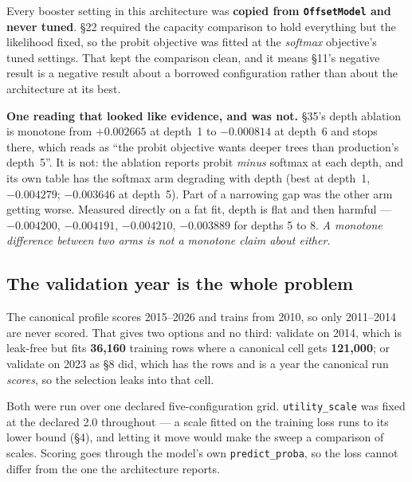 Every booster setting in this architecture was \textbf{copied from \texttt{OffsetModel} and never
tuned}. §22 required the capacity comparison to hold everything but the likelihood fixed, so the
probit objective was fitted at the \emph{softmax} objective's tuned settings. That kept the
comparison clean, and it means §11's negative result is a negative result about a borrowed
configuration rather than about the architecture at its best.

\textbf{One reading that looked like evidence, and was not.} §35's depth ablation is monotone from
$+0.002665$ at depth~1 to $-0.000814$ at depth~6 and stops there, which reads as ``the probit
objective wants deeper trees than production's depth~5''. It is not: the ablation reports probit
\emph{minus} softmax at each depth, and its own table has the softmax arm degrading with depth
(best at depth~1, $-0.004279$; $-0.003646$ at depth~5). Part of a narrowing gap was the other arm
getting worse. Measured directly on a fat fit, depth is flat and then harmful --- $-0.004200$,
$-0.004191$, $-0.004210$, $-0.003889$ for depths 5 to 8. \emph{A monotone difference between two
arms is not a monotone claim about either.}

\subsection*{The validation year is the whole problem}

The canonical profile scores 2015--2026 and trains from 2010, so only 2011--2014 are never scored.
That gives two options and no third: validate on 2014, which is leak-free but fits
\textbf{36{,}160} training rows where a canonical cell gets \textbf{121{,}000}; or validate on 2023
as §8 did, which has the rows and is a year the canonical run \emph{scores}, so the selection leaks
into that cell.

Both were run over one declared five-configuration grid. \texttt{utility\_scale} was fixed at the
declared 2.0 throughout --- a scale fitted on the training loss runs to its lower bound (§4), and
letting it move would make the sweep a comparison of scales. Scoring goes through the model's own
\texttt{predict\_proba}, so the loss cannot differ from the one the architecture reports.

